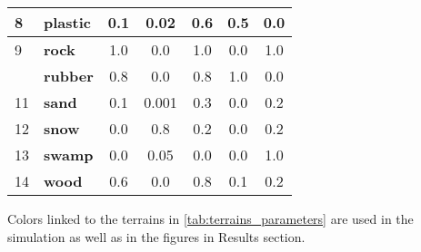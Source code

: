 \begin{table}[H]
\begin{tabular}{|l|l|c|c|c|c|c|}
\cellcolor[HTML]{96FABE}8                         & \textbf{plastic}       & 0.1                                     & 0.02                                       & 0.6                                    & 0.5                                      & 0.0                                  \\ \hline
\cellcolor[HTML]{6E5A3C}9                         & \textbf{rock}          & 1.0                                     & 0.0                                        & 1.0                                    & 0.0                                      & 1.0                                  \\ \hline
\cellcolor[HTML]{000000}{\color[HTML]{FFFFFF} 10} & \textbf{rubber}        & 0.8                                     & 0.0                                        & 0.8                                    & 1.0                                      & 0.0                                  \\ \hline
\cellcolor[HTML]{F2EE7C}11                        & \textbf{sand}          & 0.1                                     & 0.001                                      & 0.3                                    & 0.0                                      & 0.2                                  \\ \hline
\cellcolor[HTML]{FDB0FB}12                        & \textbf{snow}          & 0.0                                     & 0.8                                        & 0.2                                    & 0.0                                      & 0.2                                  \\ \hline
\cellcolor[HTML]{324B32}13                        & \textbf{swamp}         & 0.0                                     & 0.05                                       & 0.0                                    & 0.0                                      & 1.0                                  \\ \hline
\cellcolor[HTML]{5A4100}14                        & \textbf{wood}          & 0.6                                     & 0.0                                        & 0.8                                    & 0.1                                      & 0.2                                  \\ \hline
\end{tabular}
\end{table}

Colors linked to the terrains in \cref{tab:terrains_parameters} are used in the simulation as well as in the figures in Results section.

